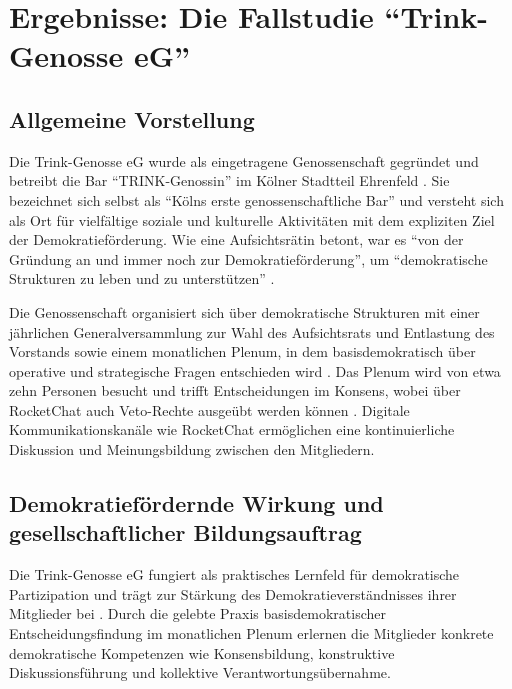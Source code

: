 \section{Ergebnisse: Die Fallstudie \enquote{Trink-Genosse eG}}

\subsection{Allgemeine Vorstellung}

Die Trink-Genosse eG wurde als eingetragene Genossenschaft gegründet und betreibt die Bar \enquote{TRINK-Genossin} im Kölner Stadtteil Ehrenfeld \parencite{SatzungTRINKGENOSSE2019}. Sie bezeichnet sich selbst als \enquote{Kölns erste genossenschaftliche Bar} und versteht sich als Ort für vielfältige soziale und kulturelle Aktivitäten mit dem expliziten Ziel der Demokratieförderung. Wie eine Aufsichtsrätin betont, war es \enquote{von der Gründung an und immer noch zur Demokratieförderung}, um \enquote{demokratische Strukturen zu leben und zu unterstützen} \parencite{mederInterviewZurGeschaftsmodellanalyse2025}.

Die Genossenschaft organisiert sich über demokratische Strukturen mit einer jährlichen Generalversammlung zur Wahl des Aufsichtsrats und Entlastung des Vorstands sowie einem monatlichen Plenum, in dem basisdemokratisch über operative und strategische Fragen entschieden wird \parencite{SatzungTRINKGENOSSE2019}. Das Plenum wird von etwa zehn Personen besucht und trifft Entscheidungen im Konsens, wobei über RocketChat auch Veto-Rechte ausgeübt werden können \parencite{mederInterviewZurGeschaftsmodellanalyse2025}. Digitale Kommunikationskanäle wie RocketChat ermöglichen eine kontinuierliche Diskussion und Meinungsbildung zwischen den Mitgliedern.

\subsection{Demokratiefördernde Wirkung und gesellschaftlicher Bildungsauftrag}

Die Trink-Genosse eG fungiert als praktisches Lernfeld für demokratische Partizipation und trägt zur Stärkung des Demokratieverständnisses ihrer Mitglieder bei \parencite{GenossenschaftsartikelUeberTrinkGenosse2022}. Durch die gelebte Praxis basisdemokratischer Entscheidungsfindung im monatlichen Plenum erlernen die Mitglieder konkrete demokratische Kompetenzen wie Konsensbildung, konstruktive Diskussionsführung und kollektive Verantwortungsübernahme. 

